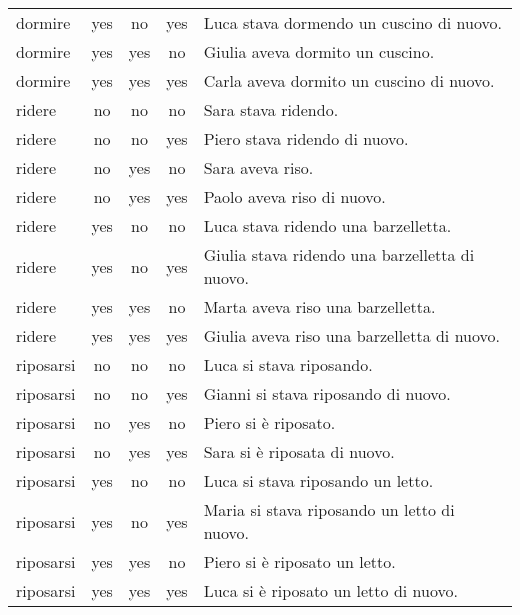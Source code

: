 \begin{longtable}{l|ccc|p{5cm}}
dormire    & yes  & no         & yes       & Luca stava dormendo un cuscino di nuovo.         \\
dormire    & yes  & yes        & no        & Giulia aveva dormito un cuscino.                 \\
dormire    & yes  & yes        & yes       & Carla aveva dormito un cuscino di nuovo.         \\
ridere     & no   & no         & no        & Sara stava ridendo.                              \\
ridere     & no   & no         & yes       & Piero stava ridendo di nuovo.                    \\
ridere     & no   & yes        & no        & Sara aveva riso.                                 \\
ridere     & no   & yes        & yes       & Paolo aveva riso di nuovo.                       \\
ridere     & yes  & no         & no        & Luca stava ridendo una barzelletta.              \\
ridere     & yes  & no         & yes       & Giulia stava ridendo una barzelletta di nuovo.   \\
ridere     & yes  & yes        & no        & Marta aveva riso una barzelletta.                \\
ridere     & yes  & yes        & yes       & Giulia aveva riso una barzelletta di nuovo.      \\
riposarsi  & no   & no         & no        & Luca si stava riposando.                         \\
riposarsi  & no   & no         & yes       & Gianni si stava riposando di nuovo.              \\
riposarsi  & no   & yes        & no        & Piero si è riposato.                             \\
riposarsi  & no   & yes        & yes       & Sara si è riposata di nuovo.                     \\
riposarsi  & yes  & no         & no        & Luca si stava riposando un letto.                \\
riposarsi  & yes  & no         & yes       & Maria si stava riposando un letto di nuovo.      \\
riposarsi  & yes  & yes        & no        & Piero si è riposato un letto.                    \\
riposarsi  & yes  & yes        & yes       & Luca si è riposato un letto di nuovo.            \\

\end{longtable}
